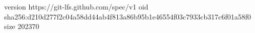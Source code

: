 version https://git-lfs.github.com/spec/v1
oid sha256:d210d277f2c04a58dd44ab4f813a86b95b1e46554f03c7933cb317c6f01a58f0
size 202370
